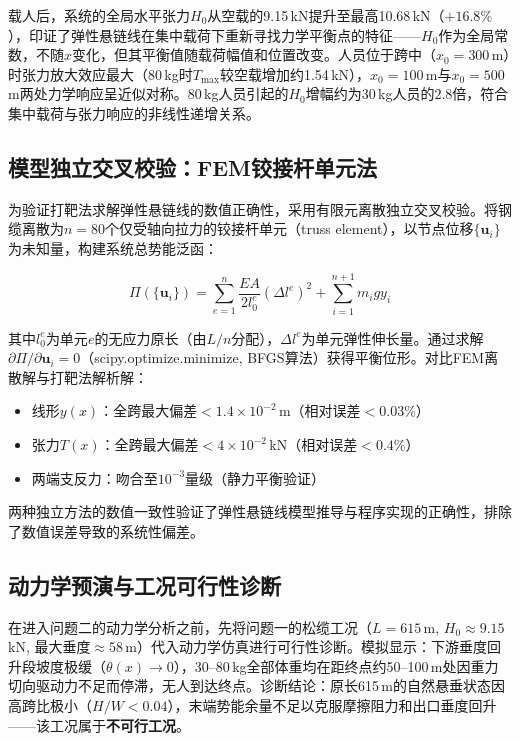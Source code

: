 \documentclass[12pt,a4paper]{ctexart}
\begin{document}
载人后，系统的全局水平张力$H_0$从空载的9.15\,kN提升至最高10.68\,kN（$+16.8\%$），印证了弹性悬链线在集中载荷下重新寻找力学平衡点的特征——$H_0$作为全局常数，不随$x$变化，但其平衡值随载荷幅值和位置改变。人员位于跨中（$x_0=300$\,m）时张力放大效应最大（80\,kg时$T_{\max}$较空载增加约1.54\,kN），$x_0=100$\,m与$x_0=500$\,m两处力学响应呈近似对称。80\,kg人员引起的$H_0$增幅约为30\,kg人员的$2.8$倍，符合集中载荷与张力响应的非线性递增关系。

\subsection{模型独立交叉校验：FEM铰接杆单元法}

为验证打靶法求解弹性悬链线的数值正确性，采用有限元离散独立交叉校验。将钢缆离散为$n=80$个仅受轴向拉力的铰接杆单元（truss element），以节点位移$\{\mathbf{u}_i\}$为未知量，构建系统总势能泛函：

\begin{equation}
  \Pi(\{\mathbf{u}_i\}) = \sum_{e=1}^{n} \frac{EA}{2l_0^e}\left(\Delta l^e\right)^2 + \sum_{i=1}^{n+1} m_i g y_i
  \label{eq:FEM_potential}
\end{equation}

其中$l_0^e$为单元$e$的无应力原长（由$L/n$分配），$\Delta l^e$为单元弹性伸长量。通过求解$\partial\Pi/\partial\mathbf{u}_i = 0$（scipy.optimize.minimize, BFGS算法）获得平衡位形。对比FEM离散解与打靶法解析解：

\begin{itemize}
  \item 线形$y(x)$：全跨最大偏差$< 1.4\times 10^{-2}$\,m（相对误差$<0.03\%$）
  \item 张力$T(x)$：全跨最大偏差$< 4\times 10^{-2}$\,kN（相对误差$<0.4\%$）
  \item 两端支反力：吻合至$10^{-3}$量级（静力平衡验证）
\end{itemize}

两种独立方法的数值一致性验证了弹性悬链线模型推导与程序实现的正确性，排除了数值误差导致的系统性偏差。

\subsection{动力学预演与工况可行性诊断}

在进入问题二的动力学分析之前，先将问题一的松缆工况（$L=615$\,m, $H_0\approx 9.15$\,kN, 最大垂度$\approx 58$\,m）代入动力学仿真进行可行性诊断。模拟显示：下游垂度回升段坡度极缓（$\theta(x)\to 0$），30--80\,kg全部体重均在距终点约50--100\,m处因重力切向驱动力不足而停滞，无人到达终点。诊断结论：原长615\,m的自然悬垂状态因高跨比极小（$H/W<0.04$），末端势能余量不足以克服摩擦阻力和出口垂度回升——该工况属于\textbf{不可行工况}。
\end{document}
